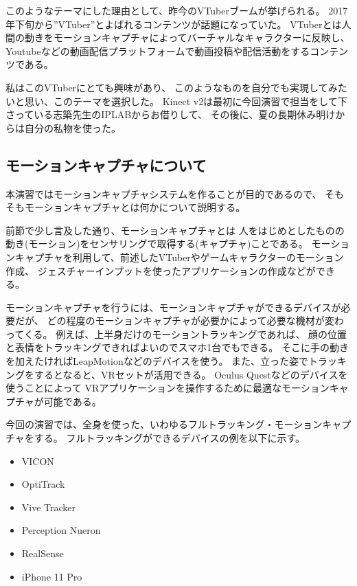\documentclass[a4j]{jsarticle}
\begin{document}
このようなテーマにした理由として、昨今のVTuberブームが挙げられる。
2017年下旬から”VTuber”とよばれるコンテンツが話題になっていた。
VTuberとは人間の動きをモーションキャプチャによってバーチャルなキャラクターに反映し、
Youtubeなどの動画配信プラットフォームで動画投稿や配信活動をするコンテンツである。

私はこのVTuberにとても興味があり、
このようなものを自分でも実現してみたいと思い、このテーマを選択した。
Kinect v2は最初に今回演習で担当をして下さっている志築先生のIPLABからお借りして、
その後に、夏の長期休み明けからは自分の私物を使った。

\subsection{モーションキャプチャについて}

本演習ではモーションキャプチャシステムを作ることが目的であるので、
そもそもモーションキャプチャとは何かについて説明する。

前節で少し言及した通り、モーションキャプチャとは
人をはじめとしたものの動き(モーション)をセンサリングで取得する(キャプチャ)ことである。
モーションキャプチャを利用して、前述したVTuberやゲームキャラクターのモーション作成、
ジェスチャーインプットを使ったアプリケーションの作成などができる。

モーションキャプチャを行うには、モーションキャプチャができるデバイスが必要だが、
どの程度のモーションキャプチャが必要かによって必要な機材が変わってくる。
例えば、上半身だけのモーショントラッキングであれば、
顔の位置と表情をトラッキングできればよいのでスマホ1台でもできる。
そこに手の動きを加えたければLeapMotionなどのデバイスを使う。
また、立った姿でトラッキングをするとなると、VRセットが活用できる。
Oculus Questなどのデバイスを使うことによって
VRアプリケーションを操作するために最適なモーションキャプチャが可能である。

今回の演習では、全身を使った、いわゆるフルトラッキング・モーションキャプチャをする。
フルトラッキングができるデバイスの例を以下に示す。

\begin{itemize}
  \item VICON
  \item OptiTrack
  \item Vive Tracker
  \item Perception Nueron
  \item RealSense
  \item iPhone 11 Pro
\end{itemize}
\end{document}
